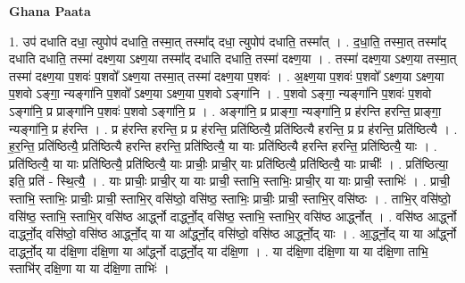 \documentclass[17pt]{extarticle}
\begin{document}
\textbf{Ghana Paata } \newline

1. उप॑ दधाति दधा॒ त्युपोप॑ दधाति॒ तस्मा॒त् तस्मा᳚द् दधा॒ त्युपोप॑ दधाति॒ तस्मा᳚त् । . द॒धा॒ति॒ तस्मा॒त् तस्मा᳚द् दधाति दधाति॒ तस्मा॑ दक्ष्ण॒या ऽक्ष्ण॒या तस्मा᳚द् दधाति दधाति॒ तस्मा॑ दक्ष्ण॒या । . तस्मा॑ दक्ष्ण॒या ऽक्ष्ण॒या तस्मा॒त् तस्मा॑ दक्ष्ण॒या प॒शवः॑ प॒शवो᳚ ऽक्ष्ण॒या तस्मा॒त् तस्मा॑ दक्ष्ण॒या प॒शवः॑ । . अ॒क्ष्ण॒या प॒शवः॑ प॒शवो᳚ ऽक्ष्ण॒या ऽक्ष्ण॒या प॒शवो ऽङ्गा॒ न्यङ्गा॑नि प॒शवो᳚ ऽक्ष्ण॒या ऽक्ष्ण॒या प॒शवो ऽङ्गा॑नि । . प॒शवो ऽङ्गा॒ न्यङ्गा॑नि प॒शवः॑ प॒शवो ऽङ्गा॑नि॒ प्र प्राङ्गा॑नि प॒शवः॑ प॒शवो ऽङ्गा॑नि॒ प्र । . अङ्गा॑नि॒ प्र प्राङ्गा॒ न्यङ्गा॑नि॒ प्र ह॑रन्ति हरन्ति॒ प्राङ्गा॒ न्यङ्गा॑नि॒ प्र ह॑रन्ति । . प्र ह॑रन्ति हरन्ति॒ प्र प्र ह॑रन्ति॒ प्रति॑ष्ठित्यै॒ प्रति॑ष्ठित्यै हरन्ति॒ प्र प्र ह॑रन्ति॒ प्रति॑ष्ठित्यै । . ह॒र॒न्ति॒ प्रति॑ष्ठित्यै॒ प्रति॑ष्ठित्यै हरन्ति हरन्ति॒ प्रति॑ष्ठित्यै॒ या याः प्रति॑ष्ठित्यै हरन्ति हरन्ति॒ प्रति॑ष्ठित्यै॒ याः । . प्रति॑ष्ठित्यै॒ या याः प्रति॑ष्ठित्यै॒ प्रति॑ष्ठित्यै॒ याः प्राचीः॒ प्राची॒र् याः प्रति॑ष्ठित्यै॒ प्रति॑ष्ठित्यै॒ याः प्राचीः᳚ । . प्रति॑ष्ठित्या॒ इति॒ प्रति॑ - स्थि॒त्यै॒ । . याः प्राचीः॒ प्राची॒र् या याः प्राची॒ स्ताभि॒ स्ताभिः॒ प्राची॒र् या याः प्राची॒ स्ताभिः॑ । . प्राची॒ स्ताभि॒ स्ताभिः॒ प्राचीः॒ प्राची॒ स्ताभि॒र् वसि॑ष्ठो॒ वसि॑ष्ठ॒ स्ताभिः॒ प्राचीः॒ प्राची॒ स्ताभि॒र् वसि॑ष्ठः । . ताभि॒र् वसि॑ष्ठो॒ वसि॑ष्ठ॒ स्ताभि॒ स्ताभि॒र् वसि॑ष्ठ आर्द्ध्नो दार्द्ध्नो॒द् वसि॑ष्ठ॒ स्ताभि॒ स्ताभि॒र् वसि॑ष्ठ आर्द्ध्नोत् । . वसि॑ष्ठ आर्द्ध्नो दार्द्ध्नो॒द् वसि॑ष्ठो॒ वसि॑ष्ठ आर्द्ध्नो॒द् या या आ᳚र्द्ध्नो॒द् वसि॑ष्ठो॒ वसि॑ष्ठ आर्द्ध्नो॒द् याः । . आ॒र्द्ध्नो॒द् या या आ᳚र्द्ध्नो दार्द्ध्नो॒द् या द॑क्षि॒णा द॑क्षि॒णा या आ᳚र्द्ध्नो दार्द्ध्नो॒द् या द॑क्षि॒णा । . या द॑क्षि॒णा द॑क्षि॒णा या या द॑क्षि॒णा ताभि॒ स्ताभि॑र् दक्षि॒णा या या द॑क्षि॒णा ताभिः॑ । \newline
\end{document}
